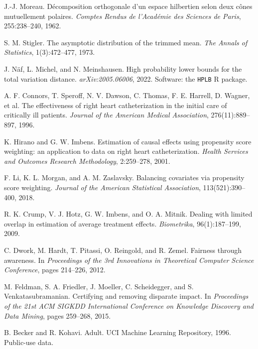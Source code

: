 J.-J. Moreau.
\newblock D{\'e}composition orthogonale d'un espace hilbertien selon deux c{\^o}nes mutuellement polaires.
\newblock \emph{Comptes Rendus de l'Acad{\'e}mie des Sciences de Paris}, 255:238--240, 1962.

S. M. Stigler.
\newblock The asymptotic distribution of the trimmed mean.
\newblock \emph{The Annals of Statistics}, 1(3):472--477, 1973.

J. N{\"a}f, L. Michel, and N. Meinshausen.
\newblock High probability lower bounds for the total variation distance.
\newblock \emph{arXiv:2005.06006}, 2022. Software: the \texttt{HPLB} R package.

A. F. Connors, T. Speroff, N. V. Dawson, C. Thomas, F. E. Harrell, D. Wagner, et al.
\newblock The effectiveness of right heart catheterization in the initial care of critically ill patients.
\newblock \emph{Journal of the American Medical Association}, 276(11):889--897, 1996.

K. Hirano and G. W. Imbens.
\newblock Estimation of causal effects using propensity score weighting: an application to data on right heart catheterization.
\newblock \emph{Health Services and Outcomes Research Methodology}, 2:259--278, 2001.

F. Li, K. L. Morgan, and A. M. Zaslavsky.
\newblock Balancing covariates via propensity score weighting.
\newblock \emph{Journal of the American Statistical Association}, 113(521):390--400, 2018.

R. K. Crump, V. J. Hotz, G. W. Imbens, and O. A. Mitnik.
\newblock Dealing with limited overlap in estimation of average treatment effects.
\newblock \emph{Biometrika}, 96(1):187--199, 2009.

C. Dwork, M. Hardt, T. Pitassi, O. Reingold, and R. Zemel.
\newblock Fairness through awareness.
\newblock In \emph{Proceedings of the 3rd Innovations in Theoretical Computer Science Conference}, pages 214--226, 2012.

M. Feldman, S. A. Friedler, J. Moeller, C. Scheidegger, and S. Venkatasubramanian.
\newblock Certifying and removing disparate impact.
\newblock In \emph{Proceedings of the 21st ACM SIGKDD International Conference on Knowledge Discovery and Data Mining}, pages 259--268, 2015.

B. Becker and R. Kohavi.
\newblock Adult.
\newblock UCI Machine Learning Repository, 1996. Public-use data.

